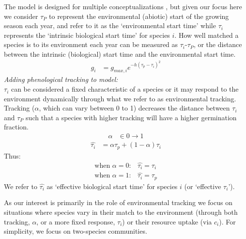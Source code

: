 \documentclass[11pt,letterpaper]{article}
\begin{document}
The model is designed for multiple conceptualizations \citep{Chesson:2004eo}, but given our focus here we consider $\tau_P$ to represent the environmental (abiotic) start of the growing season each year, and refer to it as the `environmental start time' while $\tau_i$ represents the `intrinsic biological start time' for species $i$. How well matched a species is to its environment each year can be measured as $\tau_i$-$\tau_P$, or the distance between the intrinsic (biological) start time and the environmental start time.
\begin{align}
g_{i} & = g_{max,i}e^{-h(\tau_{p}-\tau_{i})^2} 
\end{align}
\noindent \emph{Adding phenological tracking to model:}\\
$\tau_i$ can be considered a fixed characteristic of a species or it may respond to the environment dynamically through what we refer to as environmental tracking. Tracking ($\alpha$, which can vary between 0 to 1) decreases the distance between $\tau_i$ and $\tau_P$ such that a species with higher tracking  will have a higher germination fraction.
\begin{align*}
\alpha & \in 0 \rightarrow 1  
\end{align*}
\begin{align}
\hat{\tau_{i}} & = \alpha \tau_{p} + (1-\alpha)\tau_{i}
\end{align}
\noindent Thus:
\begin{align*}
\text{when } \alpha = 0: & \hat{\tau_{i}}=\tau_{i}\\
\text{when }  \alpha = 1: & \hat{\tau_{i}}=\tau_{p}
\end{align*}
We refer to $\hat{\tau_{i}}$ as `effective biological start time' for species $i$ (or `effective $\tau_i$'). 

As our interest is primarily in the role of environmental tracking we focus on situations where species vary in their match to the environment (through both tracking, $\alpha$, or a more fixed response, $\tau_i$) or their resource uptake (via $c_i$). For simplicity, we focus on two-species communities.
\end{document}
